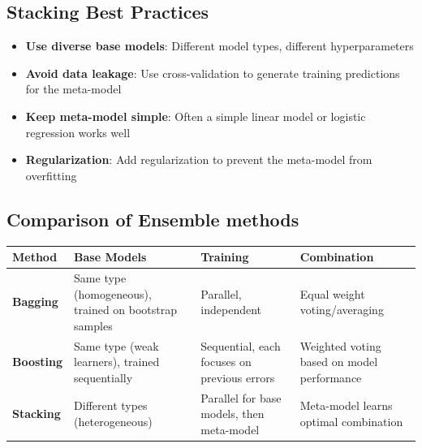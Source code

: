 \documentclass[a4paper]{article}
\theoremstyle{definition}
\begin{document}
\subsection{Stacking Best Practices}
\begin{itemize}
    \item \textbf{Use diverse base models}: Different model types, different hyperparameters 
    \item \textbf{Avoid data leakage}: Use cross-validation to generate training predictions for the meta-model 
    \item \textbf{Keep meta-model simple}: Often a simple linear model or logistic regression works well 
    \item \textbf{Regularization}: Add regularization to prevent the meta-model from overfitting
\end{itemize}
\subsection{Comparison of Ensemble methods}
\begin{tabular}{|l|p{3.4cm}|p{3.6cm}|p{3.4cm}|}
    \hline
    \textbf{Method} & \textbf{Base Models} & \textbf{Training} & \textbf{Combination} \\
    \hline
    \textbf{Bagging}
      & Same type (homogeneous), trained on bootstrap samples
      & Parallel, independent
      & Equal weight voting/averaging \\
    \hline
    \textbf{Boosting}
      & Same type (weak learners), trained sequentially
      & Sequential, each focuses on previous errors
      & Weighted voting based on model performance \\
    \hline
    \textbf{Stacking}
      & Different types (heterogeneous)
      & Parallel for base models, then meta-model
      & Meta-model learns optimal combination \\
    \hline
\end{tabular}
\end{document}
